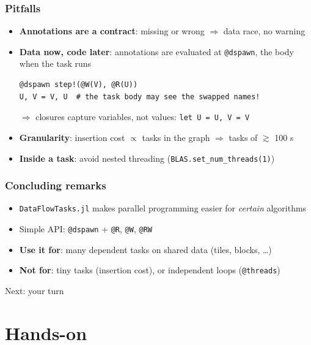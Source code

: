 \documentclass{beamer}
\newcommand{\DFT}{\texttt{DataFlowTasks.jl}}
\begin{document}
\begin{frame}[fragile]
	\frametitle{Pitfalls}
	\begin{itemize}
		\item \textbf{Annotations are a contract}: missing or wrong \(\Rightarrow\) data race, no warning
		\item \textbf{Data now, code later}: annotations are evaluated at \texttt{@dspawn}, the body when the task runs
		      \begin{verbatim}
@dspawn step!(@W(V), @R(U))
U, V = V, U  # the task body may see the swapped names!
		      \end{verbatim}
		      \(\Rightarrow\) closures capture \alert{variables}, not values: \mbox{\texttt{let U = U, V = V}}
		\item \textbf{Granularity}: insertion cost \(\propto\) tasks in the graph \(\Rightarrow\) tasks of \(\gtrsim\) 100 \textmu s
		\item \textbf{Inside a task}: avoid nested threading (\texttt{BLAS.set\_num\_threads(1)})
	\end{itemize}
\end{frame}

\begin{frame}
	\frametitle{Concluding remarks}
	\begin{itemize}
		\item \DFT{} makes parallel programming easier for \emph{certain} algorithms
		\item Simple API: \texttt{@dspawn} + \texttt{@R}, \texttt{@W}, \texttt{@RW}
		\item \textbf{Use it for}: many \alert{dependent} tasks on shared data (tiles, blocks, \ldots)
		\item \textbf{Not for}: tiny tasks (insertion cost), or independent loops (\texttt{@threads})
	\end{itemize}

	\bigskip

	\bigskip
	\centering Next: \alert{your turn}
\end{frame}

\section{Hands-on}
\end{document}
